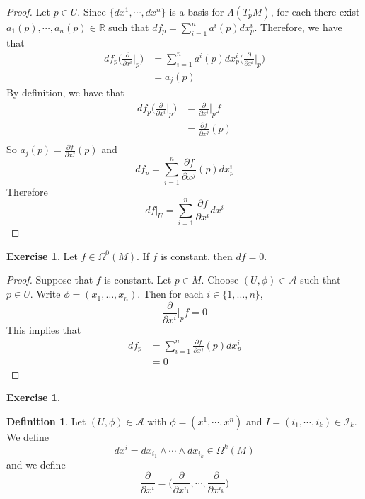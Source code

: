 \documentclass{book}
\theoremstyle{definition}
\newtheorem{defn}[definition]{Definition}
\newtheorem{ex}[definition]{Exercise}
\newcommand{\Lam}{\Lambda}
\newcommand{\Om}{\Omega}
\newcommand{\R}{\mathbb{R}}
\newcommand{\MA}{\mathcal{A}}
\newcommand{\MI}{\mathcal{I}}
\DeclareMathOperator*{\0}{\mbf{0}}
\DeclareMathOperator*{\1}{\mbf{1}}
\newcommand{\p}{\partial}
\begin{document}
	\begin{proof}
		Let $p \in U$. Since $\{dx^1, \cdots, dx^n\}$ is a basis for $\Lam(T_pM)$, for each there exist $a_1(p), \cdots, a_n(p) \in \R$ such that $df_p = \sum\limits_{i=1}^n a^i(p)dx^i_p$. Therefore, we have that 
		\begin{align*}
			df_p \bigg(\frac{\p}{\p x^i} \bigg|_p \bigg) 
			&= \sum\limits_{i=1}^n a^i(p)dx^i_p \bigg(\frac{\p}{\p x^i} \bigg|_p \bigg)  \\
			&=  a_j(p)
		\end{align*}
		By definition, we have that 
		\begin{align*}
			df_p\bigg(\frac{\p}{\p x^i} \bigg|_p \bigg) 
			&= \frac{\p}{\p x^i} \bigg|_p f \\ 
			&= \frac{\p f}{\p x^j} (p)\\
		\end{align*}
		So $a_j(p) = \frac{\p f}{\p x^j} (p)$ and $$df_p = \sum\limits_{i=1}^n \frac{\p f}{\p x^j} (p)dx^i_p$$
		Therefore $$df|_U = \sum\limits_{i=1}^n {\frac{\p f}{\p x^i}}dx^i$$
	\end{proof}
	
	\begin{ex}
	Let $f \in \Om^0(M)$. If $f$ is constant, then $df = 0$. 
	\end{ex}
	
	\begin{proof}
	Suppose that $f$ is constant. Let $p \in M$. Choose $(U, \phi) \in \MA$ such that $p \in U$. Write $\phi = (x_1, \dots, x_n)$. Then for each $i \in \{1, \dots, n\}$, $$\frac{\p}{\p x^i} \bigg|_p f = 0$$ This implies that 
	\begin{align*}
	df_p 
	&= \sum\limits_{i=1}^n \frac{\p f}{\p x^j} (p)dx^i_p \\
	&= 0
	\end{align*}
	\end{proof}
	
	\begin{ex}
	
	\end{ex}

	\begin{defn}
		Let $(U, \phi) \in \MA$ with $\phi = (x^1, \cdots, x^n)$ and $I = (i_1, \cdots, i_k) \in \MI_k$. We define $$dx^i = dx_{i_1} \wedge \cdots \wedge dx_{i_k} \in \Om^k(M)$$ 
		and we define $$\frac{\p}{\p x^i}= \bigg(\frac{\p}{\p x^{i_1}}, \cdots, \frac{\p}{\p x^{i_k}} \bigg)$$

	\end{defn}
	
\end{document}
